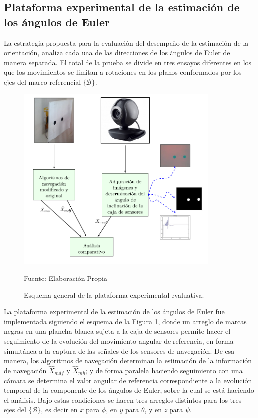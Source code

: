 \documentclass[conference]{IEEEtran}
\newcommand{\marco}[1]{\{\mathcal{#1}\}}
\begin{document}
\subsection{Plataforma experimental de la estimación de los ángulos de Euler}\label{Plataforma2}
La estrategia propuesta para la evaluación del desempeño de la estimación de la orientación, analiza cada una de las direcciones de los ángulos de Euler de manera separada. El total de la prueba se divide en tres ensayos diferentes en los que los movimientos se limitan a rotaciones en los planos conformados por los ejes del marco referencial $\marco{B}$.\par
\begin{figure}
\centering
\includegraphics[width=26.5em]{plataforma_fig13.pdf}
\caption{Esquema general de la plataforma experimental evaluativa.}
\scriptsize{Fuente: Elaboración Propia}
\label{plataforma_fig10}
\end{figure}
La plataforma experimental de la estimación de los ángulos de Euler fue implementada siguiendo el esquema de la Figura \ref{plataforma_fig10}, donde un arreglo de marcas negras en una plancha blanca sujeta a la caja de sensores permite hacer el seguimiento de la evolución del movimiento angular de referencia, en forma simultánea a la captura de las señales de los sensores de navegación. De esa manera, los algoritmos de navegación determinan la estimación de la información de navegación $\hat{X}_{mdf}$ y $\hat{X}_{mh}$; y de forma paralela haciendo seguimiento con una cámara se determina el valor angular de referencia correspondiente a la evolución temporal de la componente de los ángulos de Euler, sobre la cual se está haciendo el análisis.
Bajo estas condiciones se hacen tres arreglos distintos para los tres ejes del $\marco{B}$, es decir en $x$ para $\phi$, en $y$ para $\theta$, y en $z$ para $\psi$.
\end{document}
